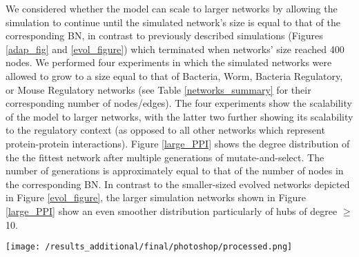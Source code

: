 
We considered whether the model can scale to larger networks
by allowing the simulation to continue until the simulated network's size is equal to 
that of the corresponding BN, in contrast to previously described simulations (Figures \ref{adap_fig} and \ref{evol_figure}) which terminated when networks' size reached 
400 nodes. 
We performed four experiments in which the simulated networks were allowed to grow to a size
equal to that of Bacteria, Worm, Bacteria Regulatory, or Mouse Regulatory networks (see Table \ref{networks_summary} for their corresponding number of nodes/edges). 
The four experiments show the scalability of the model to larger networks, with the latter two further showing its scalability to 
the regulatory context (as opposed to all other networks which represent protein-protein interactions). 
Figure \ref{large_PPI}  shows the degree distribution of the 
the fittest network after multiple generations of mutate-and-select. The number of generations is approximately equal to that of the number
of nodes in the corresponding BN. In contrast to the smaller-sized evolved networks depicted in Figure \ref{evol_figure}, 
the larger simulation networks shown in Figure \ref{large_PPI} show an even smoother distribution particularly of hubs of degree $\geq$10. 
\begin{figure*}[h]
		\centering
		\texttt{[image: /results\_additional/final/photoshop/processed.png]}%
		\caption{
				Scaling to larger networks and applicability to different physiological contexts. Networks start empty and undergo reassign-edge, add-node, 
				add-edge mutations. An evolving network grows by adding one node, and one or more edges while maintaining its edge:node ratio equal  
				that of its corresponding real BN. The simulation terminates when networks reach the same size (number of nodes) as that of the corresponding real BN. 
				The final 
				degree distribution of the fittest network is illustrated (horizontal black dashes) against that of the corresponding BN 
				(vertical coloured dashes). 
				Simulating against Bacteria and Mouse Regulatory networks (bottom row),  which are comprised of TF-gene, TF-TF and (in Mouse only) small RNA-gene 
				interactions as opposed to all 
				other networks which are comprised of protein-protein interactions, further shows the applicability of the model to different physiological contexts.
		}
		\label{large_PPI}
\end{figure*}	
	
		
		